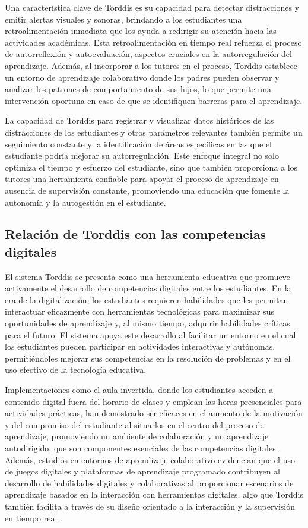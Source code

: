 \documentclass[a4paper,fleqn]{cas-sc}
\begin{document}
	Una característica clave de Torddis es su capacidad para detectar distracciones y emitir alertas visuales y sonoras, brindando a los estudiantes una retroalimentación inmediata que los ayuda a redirigir su atención hacia las actividades académicas. Esta retroalimentación en tiempo real refuerza el proceso de autorreflexión y autoevaluación, aspectos cruciales en la autorregulación del aprendizaje. Además, al incorporar a los tutores en el proceso, Torddis establece un entorno de aprendizaje colaborativo donde los padres pueden observar y analizar los patrones de comportamiento de sus hijos, lo que permite una intervención oportuna en caso de que se identifiquen barreras para el aprendizaje.
	
	La capacidad de Torddis para registrar y visualizar datos históricos de las distracciones de los estudiantes y otros parámetros relevantes también permite un seguimiento constante y la identificación de áreas específicas en las que el estudiante podría mejorar su autorregulación. Este enfoque integral no solo optimiza el tiempo y esfuerzo del estudiante, sino que también proporciona a los tutores una herramienta confiable para apoyar el proceso de aprendizaje en ausencia de supervisión constante, promoviendo una educación que fomente la autonomía y la autogestión en el estudiante.
	
	\subsection{Relación de Torddis con las competencias digitales}
	El sistema Torddis se presenta como una herramienta educativa que promueve activamente el desarrollo de competencias digitales entre los estudiantes. En la era de la digitalización, los estudiantes requieren habilidades que les permitan interactuar eficazmente con herramientas tecnológicas para maximizar sus oportunidades de aprendizaje y, al mismo tiempo, adquirir habilidades críticas para el futuro. El sistema apoya este desarrollo al facilitar un entorno en el cual los estudiantes pueden participar en actividades interactivas y autónomas, permitiéndoles mejorar sus competencias en la resolución de problemas y en el uso efectivo de la tecnología educativa.
	
	Implementaciones como el aula invertida, donde los estudiantes acceden a contenido digital fuera del horario de clases y emplean las horas presenciales para actividades prácticas, han demostrado ser eficaces en el aumento de la motivación y del compromiso del estudiante al situarlos en el centro del proceso de aprendizaje, promoviendo un ambiente de colaboración y un aprendizaje autodirigido, que son componentes esenciales de las competencias digitales \citep{Mohamed2018Implementing}. Además, estudios en entornos de aprendizaje colaborativo evidencian que el uso de juegos digitales y plataformas de aprendizaje programado contribuyen al desarrollo de habilidades digitales y colaborativas al proporcionar escenarios de aprendizaje basados en la interacción con herramientas digitales, algo que Torddis también facilita a través de su diseño orientado a la interacción y la supervisi{\'o}n en tiempo real
	\citep{Echeverria2011AFramework}.
	
\end{document}
